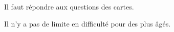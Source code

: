 \documentclass{grand-jeu}
\begin{document}
\begin{liste-materiel}
\end{liste-materiel}

\begin{regles}
Il faut répondre aux questions des cartes.

Il n’y a pas de limite en difficulté pour des plus âgés.
\end{regles}

\begin{imaginaire}

\end{imaginaire}

\begin{moments-stop}
\end{moments-stop}


\end{document}
